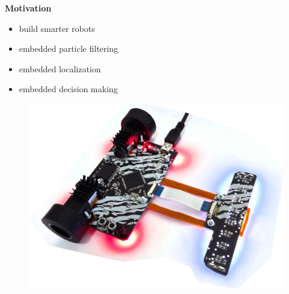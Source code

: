\documentclass[xcolor=dvipsnames]{beamer}
\begin{document}
\begin{frame}{\bf Motivation}

\begin{itemize}
  \item build smarter robots
  \item embedded particle filtering
  \item embedded localization
  \item embedded decision making
\end{itemize}

  \begin{figure}
    \includegraphics[scale=0.07]{../../pictures/robot_ascender.jpg}
  \end{figure}


\end{frame}
\end{document}
